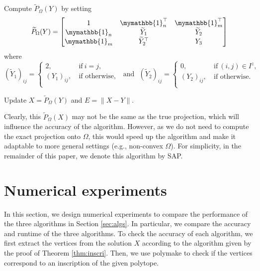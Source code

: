 \documentclass[smallextended, envcountsame]{svjour3}
\begin{document}
\begin{algorithm}[!htb]
{            Compute $\widetilde{P}_\Omega(Y)$ by setting
            \begin{equation*}
                \widetilde{P}_\Omega(Y) = \begin{bmatrix}
                    1 & \mymathbb{1}_n^\top & \mymathbb{1}_m^\top\\
                    \mymathbb{1}_n & \widetilde{Y}_1 & \widetilde{Y}_2\\
                    \mymathbb{1}_m & \widetilde{Y}_2^\top & Y_3
                \end{bmatrix}
            \end{equation*}
            where
            \begin{equation*}
                \left(\widetilde{Y}_1\right)_{ij} = \begin{cases}
                    2, &~\text{if}~i=j,\\
                    \left(Y_1\right)_{ij}, &~\text{if otherwise},\\
                \end{cases}~~~\text{and}~~~
                \left(\widetilde{Y}_2\right)_{ij} = \begin{cases}
                    0, &~\text{if}~(i,j)\in I^z,\\
                    \left(Y_2\right)_{ij}, &~\text{if otherwise}.\\
                \end{cases}
            \end{equation*}

            Update $X=\widetilde{P}_\Omega(Y)$ and $E=\|X-Y\|$.
        }
    \end{algorithm}
    
    Clearly, this $\widetilde{P}_\Omega(X)$ may not be the same as the true projection, which will influence the accuracy of the algorithm.  However, as we do not need to compute the exact projection onto $\Omega$, this would speed up the algorithm and make it adaptable to more general settings (e.g., non-convex $\Omega$).  For simplicity, in the remainder of this paper, we denote this algorithm by SAP.


    
    

\section{Numerical experiments}\label{sec:numexp}
    In this section, we design numerical experiments to compare the performance of the three algorithms in Section \ref{sec:algs}.  In particular, we compare the accuracy and runtime of the three algorithms.  To check the accuracy of each algorithm, we first extract the vertices from the solution $X$ according to the algorithm given by the proof of Theorem \ref{thm:inscri}.  Then, we use polymake \cite{Gawrilow2000} to check if the vertices correspond to an inscription of the given polytope.
    
\end{document}
